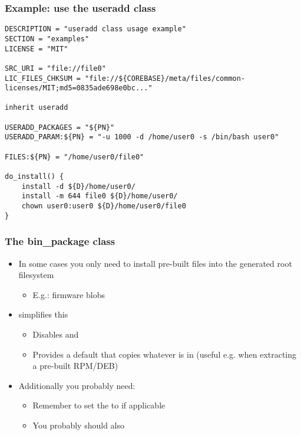 \begin{frame}[fragile]
  \frametitle{Example: use the useradd class}
  \begin{block}{}
    \begin{verbatim}
DESCRIPTION = "useradd class usage example"
SECTION = "examples"
LICENSE = "MIT"

SRC_URI = "file://file0"
LIC_FILES_CHKSUM = "file://${COREBASE}/meta/files/common-licenses/MIT;md5=0835ade698e0bc..."

inherit useradd

USERADD_PACKAGES = "${PN}"
USERADD_PARAM:${PN} = "-u 1000 -d /home/user0 -s /bin/bash user0"

FILES:${PN} = "/home/user0/file0"

do_install() {
    install -d ${D}/home/user0/
    install -m 644 file0 ${D}/home/user0/
    chown user0:user0 ${D}/home/user0/file0
}
    \end{verbatim}
  \end{block}
\end{frame}

\begin{frame}
  \frametitle{The bin\_package class}
  \begin{itemize}
    \item In some cases you only need to install pre-built files into the
      generated root filesystem
      \begin{itemize}
        \item E.g.: firmware blobs
      \end{itemize}
    \item {} simplifies this
      \begin{itemize}
        \item Disables  and 
        \item Provides a default  that copies whatever is
          in  (useful e.g. when extracting a pre-built RPM/DEB)
      \end{itemize}
    \item Additionally you probably need:
      \begin{itemize}
        \item Remember to set the  to  if applicable
        \item You probably should also 
      \end{itemize}
  \end{itemize}
\end{frame}

